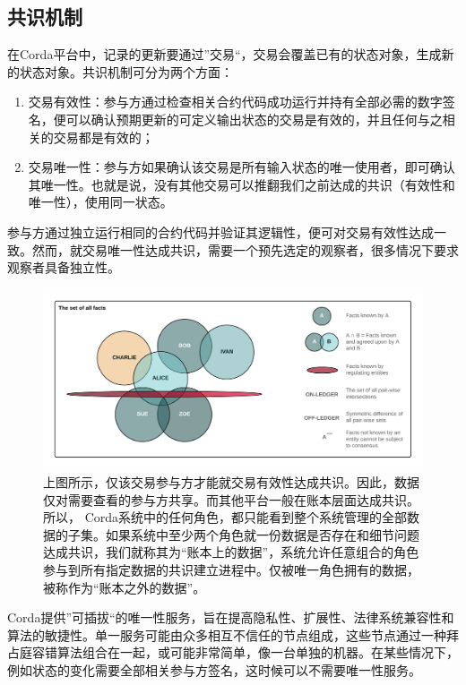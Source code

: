\documentclass[UTF8]{ctexart}
\begin{document}
\subsection{共识机制}
在Corda平台中，记录的更新要通过”交易“，交易会覆盖已有的状态对象，生成新的状态对象。共识机制可分为两个方面：
\begin{enumerate}
\item 交易有效性：参与方通过检查相关合约代码成功运行并持有全部必需的数字签名，便可以确认预期更新的可定义输出状态的交易是有效的，并且任何与之相关的交易都是有效的；
\item 交易唯一性：参与方如果确认该交易是所有输入状态的唯一使用者，即可确认其唯一性。也就是说，没有其他交易可以推翻我们之前达成的共识（有效性和唯一性），使用同一状态。
\end{enumerate}

参与方通过独立运行相同的合约代码并验证其逻辑性，便可对交易有效性达成一致。然而，就交易唯一性达成共识，需要一个预先选定的观察者，很多情况下要求观察者具备独立性。

\begin{figure}[H]
    \includegraphics[scale = .5, center]{Consensus}
    \caption{上图所示，仅该交易参与方才能就交易有效性达成共识。因此，数据仅对需要查看的参与方共享。而其他平台一般在账本层面达成共识。所以， Corda系统中的任何角色，都只能看到整个系统管理的全部数据的子集。如果系统中至少两个角色就一份数据是否存在和细节问题达成共识，我们就称其为“账本上的数据”，系统允许任意组合的角色参与到所有指定数据的共识建立进程中。仅被唯一角色拥有的数据，被称作为“账本之外的数据”。}
\end{figure}

Corda提供”可插拔“的唯一性服务，旨在提高隐私性、扩展性、法律系统兼容性\cite{EUC}和算法的敏捷性。单一服务可能由众多相互不信任的节点组成，这些节点通过一种拜占庭容错算法组合在一起，或可能非常简单，像一台单独的机器。在某些情况下，例如状态的变化需要全部相关参与方签名，这时候可以不需要唯一性服务。
\end{document}
